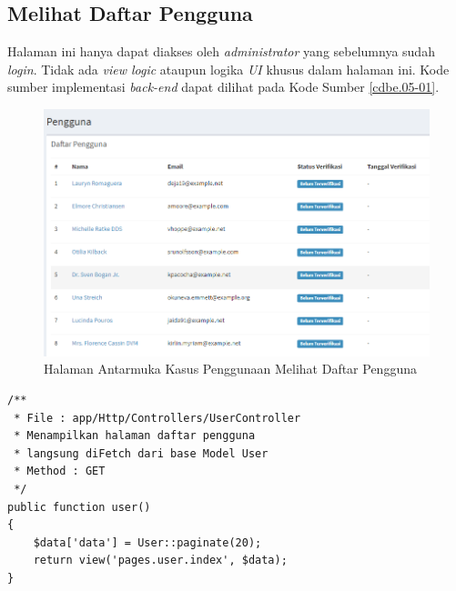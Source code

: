 \subsection{Melihat Daftar Pengguna}
Halaman ini hanya dapat diakses oleh \textit{administrator} yang sebelumnya sudah \textit{login}. Tidak ada \textit{view logic} ataupun logika \textit{UI} khusus dalam halaman ini. Kode sumber implementasi \textit{back-end} dapat dilihat pada Kode Sumber \ref{cdbe.05-01}.

\begin{figure}[h]
	\centering
	\includegraphics[width=.8\textwidth]{images/bab4/ui/05-01.png}
	\caption{Halaman Antarmuka Kasus Penggunaan Melihat Daftar Pengguna}
	\label{ui.05-01}
\end{figure}
\newpage
\begin{lstlisting}[label=cdbe.05-01,style=php,caption=Implementasi Antarmuka Melihat Daftar Pengguna]
/** 
 * File : app/Http/Controllers/UserController
 * Menampilkan halaman daftar pengguna
 * langsung diFetch dari base Model User
 * Method : GET
 */
public function user()
{
    $data['data'] = User::paginate(20);
    return view('pages.user.index', $data);
}
\end{lstlisting}


      
